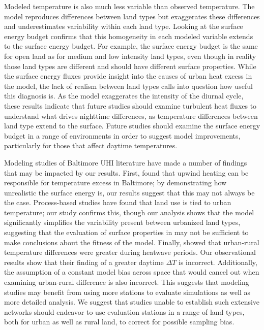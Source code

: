 \documentclass[draft,linenumbers]{agujournal}
\begin{document}
Modeled temperature is also much less variable than observed temperature. The model reproduces differences between land types but exaggerates these differences and underestimates variability within each land type. Looking at the surface energy budget confirms that this homogeneity in each modeled variable extends to the surface energy budget.  
For example, the surface energy budget is the same for open land as for medium and low intensity land types, even though in reality those land types are different and should have different surface properties. While the surface energy fluxes provide insight into the causes of urban heat excess in the model, the lack of realism between land types calls into question how useful this diagnosis is. 
As the model exaggerates the intensity of the diurnal cycle, these results indicate that future studies should examine turbulent heat fluxes to understand what drives nighttime differences, as temperature differences between land type extend to the surface. Future studies should examine the surface energy budget in a range of environments in order to suggest model improvements, particularly for those that affect daytime temperatures. 

Modeling studies of Baltimore UHI literature have made a number of findings that may be impacted by our results. 
First, \cite{zhang2011impact} found that upwind heating can be responsible for temperature excess in Baltimore; by demonstrating how unrealistic the surface energy is, our results suggest that this may not always be the case.
Process-based studies \cite{li2013modeling} have found that land use is tied to urban temperature; our study confirms this, though our analysis shows that the model significantly simplifies the variability present between urbanized land types, suggesting that the evaluation of surface properties in \cite{li2015contrasting} may not be sufficient to make conclusions about the fitness of the model. 
Finally, \cite{li2013synergistic} showed that urban-rural temperature differences were greater during heatwave periods. Our observational results show that their finding of a greater daytime $\Delta T$ is incorrect. Additionally, the assumption of a constant model bias across space that would cancel out when examining urban-rural difference is also incorrect. 
This suggests that modeling studies may benefit from using more stations to evaluate simulations as well as more detailed analysis. We suggest that studies unable to establish such extensive networks should endeavor to use evaluation stations in a range of land types, both for urban as well as rural land, to correct for possible sampling bias. 
\end{document}
